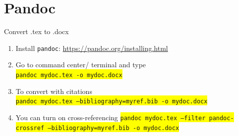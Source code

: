 \documentclass[
11pt, %
]{beamer}
\begin{document}
	\section{Pandoc}
	\begin{frame}{Convert .tex to .docx}
		\begin{enumerate}
			\item Install \texttt{pandoc}: \url{https://pandoc.org/installing.html}
			\item Go to command center/ terminal and type \\
			\colorbox{yellow}{\texttt{pandoc mydoc.tex -o mydoc.docx}}
			\item To convert with citations \\
			\colorbox{yellow}{\texttt{pandoc mydoc.tex --bibliography=myref.bib -o mydoc.docx}}
			\item You can turn on cross-referencing
			\colorbox{yellow}{\texttt{pandoc mydoc.tex --filter pandoc-crossref --bibliography=myref.bib -o mydoc.docx}}
		\end{enumerate}
	\end{frame}
	

	
		
	
	
	
	
\end{document}
